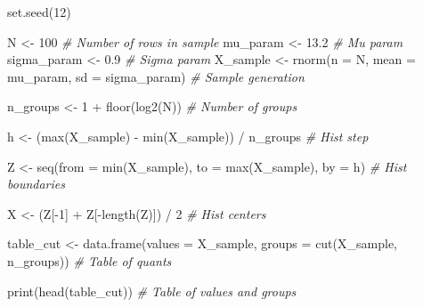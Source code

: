 \documentclass[
  14,
]{article}
\newenvironment{Shaded}{\begin{snugshade}}{\end{snugshade}}
\newcommand{\AttributeTok}[1]{\textcolor[rgb]{0.77,0.63,0.00}{#1}}
\newcommand{\CommentTok}[1]{\textcolor[rgb]{0.56,0.35,0.01}{\textit{#1}}}
\newcommand{\DecValTok}[1]{\textcolor[rgb]{0.00,0.00,0.81}{#1}}
\newcommand{\FloatTok}[1]{\textcolor[rgb]{0.00,0.00,0.81}{#1}}
\newcommand{\FunctionTok}[1]{\textcolor[rgb]{0.00,0.00,0.00}{#1}}
\newcommand{\NormalTok}[1]{#1}
\newcommand{\OtherTok}[1]{\textcolor[rgb]{0.56,0.35,0.01}{#1}}
\newcommand{\SpecialCharTok}[1]{\textcolor[rgb]{0.00,0.00,0.00}{#1}}
\begin{document}
\begin{Shaded}
\begin{Highlighting}[]
\FunctionTok{set.seed}\NormalTok{(}\DecValTok{12}\NormalTok{)}

\NormalTok{N }\OtherTok{\textless{}{-}} \DecValTok{100}                                        \CommentTok{\# Number of rows in sample}
\NormalTok{mu\_param }\OtherTok{\textless{}{-}} \FloatTok{13.2}                                \CommentTok{\# Mu param}
\NormalTok{sigma\_param }\OtherTok{\textless{}{-}} \FloatTok{0.9}                              \CommentTok{\# Sigma param}
\NormalTok{X\_sample }\OtherTok{\textless{}{-}} \FunctionTok{rnorm}\NormalTok{(}\AttributeTok{n =}\NormalTok{ N, }
                  \AttributeTok{mean =}\NormalTok{ mu\_param, }
                  \AttributeTok{sd =}\NormalTok{ sigma\_param)             }\CommentTok{\# Sample generation}

\NormalTok{n\_groups }\OtherTok{\textless{}{-}} \DecValTok{1} \SpecialCharTok{+} \FunctionTok{floor}\NormalTok{(}\FunctionTok{log2}\NormalTok{(N))                      }\CommentTok{\# Number of groups}

\NormalTok{h }\OtherTok{\textless{}{-}}\NormalTok{ (}\FunctionTok{max}\NormalTok{(X\_sample) }\SpecialCharTok{{-}} \FunctionTok{min}\NormalTok{(X\_sample)) }\SpecialCharTok{/}\NormalTok{ n\_groups     }\CommentTok{\# Hist step}

\NormalTok{Z }\OtherTok{\textless{}{-}} \FunctionTok{seq}\NormalTok{(}\AttributeTok{from =} \FunctionTok{min}\NormalTok{(X\_sample),}
         \AttributeTok{to =} \FunctionTok{max}\NormalTok{(X\_sample),}
         \AttributeTok{by =}\NormalTok{ h)                                    }\CommentTok{\# Hist boundaries}

\NormalTok{X }\OtherTok{\textless{}{-}}\NormalTok{ (Z[}\SpecialCharTok{{-}}\DecValTok{1}\NormalTok{] }\SpecialCharTok{+}\NormalTok{ Z[}\SpecialCharTok{{-}}\FunctionTok{length}\NormalTok{(Z)]) }\SpecialCharTok{/} \DecValTok{2}                    \CommentTok{\# Hist centers}

\NormalTok{table\_cut }\OtherTok{\textless{}{-}} \FunctionTok{data.frame}\NormalTok{(}\AttributeTok{values =}\NormalTok{ X\_sample, }
                        \AttributeTok{groups =} \FunctionTok{cut}\NormalTok{(X\_sample, n\_groups)) }\CommentTok{\# Table of quants}

\FunctionTok{print}\NormalTok{(}\FunctionTok{head}\NormalTok{(table\_cut))                             }\CommentTok{\# Table of values and groups}
\end{Highlighting}
\end{Shaded}
\end{document}
